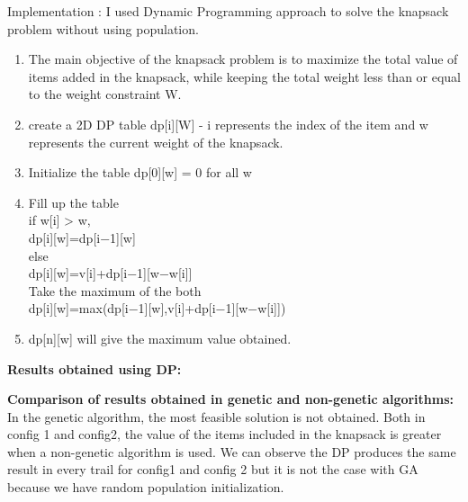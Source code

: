 \documentclass{article}
\begin{document}
{{{{Implementation : I used Dynamic Programming approach to solve the knapsack problem without using population. 
\begin{enumerate}
    \item The main objective of the knapsack problem is to maximize the total value of items added in the knapsack, while keeping the total weight less than or equal to the weight constraint W.
    \item create a 2D DP table dp[i][W] - i represents the index of the item and w represents the current weight of the knapsack.
    \item Initialize the table dp[0][w] = 0 for all w
    \item Fill up the table\\
    if w[i] > w, \\
    dp[i][w]=dp[i−1][w]\\
    else\\
    dp[i][w]=v[i]+dp[i−1][w−w[i]]\\
    Take the maximum of the both\\
    dp[i][w]=max(dp[i−1][w],v[i]+dp[i−1][w−w[i]])
    \item dp[n][w] will give the maximum value obtained.
\end{enumerate}
\textbf{Results obtained using DP: }\\
\begin{table}[H]
\centering
{}
\caption{Results using DP} 
\end{table}
\textbf{Comparison of results obtained in genetic and non-genetic algorithms:} In the genetic algorithm, the most feasible solution is not obtained. Both in config 1 and config2, the value of the items included in the knapsack is greater when a non-genetic algorithm is used.
We can observe the DP produces the same result in every trail for config1 and config 2 but it is not the case with GA because we have random population initialization.
}}}}
\end{document}

